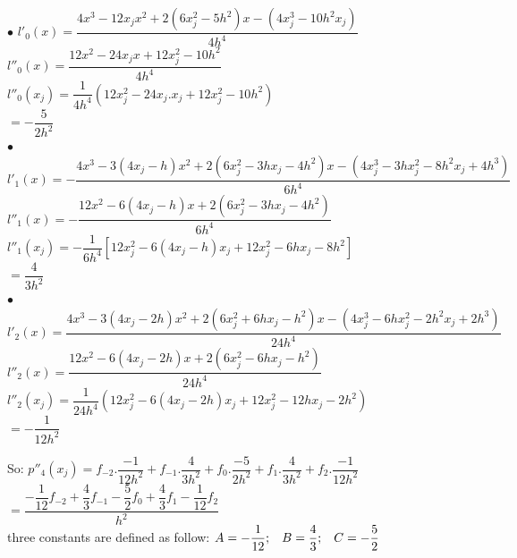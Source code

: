 \documentclass[14pt,a4paper]{article}
\begin{document}
\begin{enumerate}
	$\bullet$ $ l'_0(x) = \dfrac{4x^3 -12x_jx^2 + 2(6x_j^2 -5h^2)x -(4x_j^3-10h^2x_j)}{4h^4}$\\
	\hspace*{0.2cm} $l''_0(x) = \dfrac{12x^2 - 24x_jx + 12x_j^2 -10h^2}{4h^4}$\\
	\hspace*{0.2cm} $l''_0(x_j) = \dfrac{1}{4h^4} (12x_j^2 - 24x_j.x_j + 12x_j^2 -10h^2)$\\
	\hspace*{1.4cm} $ = - \dfrac{5}{2h^2}$\\
	
	$\bullet$ $ l'_1(x) = - \dfrac{4x^3 -3(4x_j-h)x^2 + 2(6x_j^2 -3hx_j -4h^2)x -(4x_j^3 -3hx_j^2 -8h^2x_j +4h^3)}{6h^4} $\\
	\hspace*{0.2cm} $l''_1(x) = - \dfrac{12x^2 -6(4x_j-h)x +2(6x_j^2 - 3hx_j -4h^2)}{6h^4}$\\
	\hspace*{0.2cm} $l''_1(x_j) = -\dfrac{1}{6h^4} [12x_j^2 -6(4x_j-h)x_j + 12x_j^2 -6hx_j -8h^2]$\\
	\hspace*{1.4cm} $ = \dfrac{4}{3h^2}$\\
	
	$\bullet$ $ l'_2(x) = \dfrac{4x^3- 3(4x_j-2h)x^2 + 2(6x_j^2+6hx_j-h^2)x -(4x_j^3-6hx_j^2-2h^2x_j +2h^3)}{24h^4}$\\
	\hspace*{0.2cm} $l''_2(x) = \dfrac{12x^2 - 6(4x_j-2h)x+2(6x_j^2-6hx_j-h^2)}{24h^4}$\\
	\hspace*{0.2cm} $l''_2(x_j) = \dfrac{1}{24h^4} (12x_j^2 -6(4x_j-2h)x_j + 12x_j^2 - 12hx_j -2h^2)$\\
	\hspace*{1.4cm} $ = -\dfrac{1}{12h^2}$
	\pagebreak
	
	So: \hspace{0.3cm} $p''_4(x_j) = f_{-2}.\dfrac{-1}{12h^2} + f_{-1}.\dfrac{4}{3h^2} +f_0.\dfrac{-5}{2h^2} + f_1.\dfrac{4}{3h^2} + f_2.\dfrac{-1}{12h^2} $\\
	\hspace*{2.4cm} $ = \dfrac{-\dfrac{1}{12}f_{-2} + \dfrac{4}{3}f_{-1} - \dfrac{5}{2}f_0 + \dfrac{4}{3}f_1 - \dfrac{1}{12}f_2}{h^2} $\\
	three constants are defined as follow: $ A = -\dfrac{1}{12}; \hspace{0.3cm} B = \dfrac{4}{3}; \hspace{0.3cm} C = -\dfrac{5}{2}$\\
	

\end{enumerate}
\end{document}
